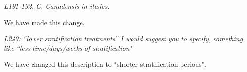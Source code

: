 \documentclass[11pt]{article}
\begin{document}
\emph{L191-192: C. Canadensis in italics.}

We have made this change.

\emph{L249: “lower stratification treatments” I would suggest you to specify, something like ``less time/days/weeks of stratification"}

We have changed this description to ``shorter stratification periods".


\end{document}
